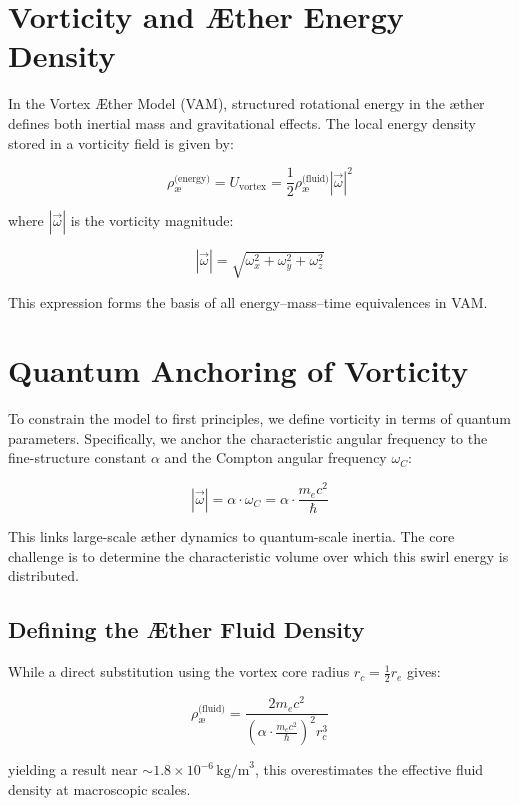 \documentclass[12pt]{article}
\begin{document}
    \section{Vorticity and Æther Energy Density}

    In the Vortex \AE{}ther Model (VAM), structured rotational energy in the æther defines both inertial mass and gravitational effects. The local energy density stored in a vorticity field is given by:

    \[
        \rho_{\text{\ae}}^{\text{(energy)}} = U_{\text{vortex}} = \frac{1}{2} \rho_{\text{\ae}}^{\text{(fluid)}} |\vec{\omega}|^2
    \]

    where \( |\vec{\omega}| \) is the vorticity magnitude:

    \[
        |\vec{\omega}| = \sqrt{\omega_x^2 + \omega_y^2 + \omega_z^2}
    \]

    This expression forms the basis of all energy–mass–time equivalences in VAM.

    \section{Quantum Anchoring of Vorticity}

    To constrain the model to first principles, we define vorticity in terms of quantum parameters. Specifically, we anchor the characteristic angular frequency to the fine-structure constant \( \alpha \) and the Compton angular frequency \( \omega_C \):

    \[
        |\vec{\omega}| = \alpha \cdot \omega_C = \alpha \cdot \frac{m_e c^2}{\hbar}
    \]

    This links large-scale æther dynamics to quantum-scale inertia. The core challenge is to determine the characteristic volume over which this swirl energy is distributed.

    \subsection{Defining the Æther Fluid Density}

    While a direct substitution using the vortex core radius \( r_c = \frac{1}{2} r_e \) gives:

    \[
        \rho_{\text{\ae}}^{\text{(fluid)}} = \frac{2 m_e c^2}{\left(\alpha \cdot \frac{m_e c^2}{\hbar}\right)^2 r_c^3}
    \]

    yielding a result near \( \sim 1.8 \times 10^{-6} \, \text{kg/m}^3 \), this overestimates the effective fluid density at macroscopic scales.
\end{document}
